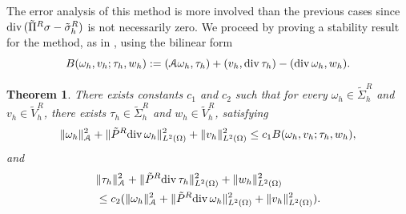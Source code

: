 \documentclass[12pt]{amsart}
\numberwithin{equation}{section}
\newtheorem{theorem}{Theorem}[section]
\theoremstyle{definition}
\theoremstyle{remark}
\renewcommand{\(}{\bigl(}
\renewcommand{\)}{\bigr)}
\newcommand{\tsigma}{\tilde{\sigma}}
\newcommand{\dive}{{\ensuremath\mathop{\mathrm{div}\,}}} %
\newcommand{\Aa}{\mathcal{A}}
\begin{document}
The error analysis of this method is more involved than the previous cases since $\dive( \tilde{\Pi}^R  \sigma-\tsigma^R_h)$  is not necessarily zero. We proceed
by proving a stability result for the method, as in \cite{arnold2006finite}, using
the bilinear form
\begin{equation*}
B(\omega_h, v_h; \tau_h, w_h):= (\Aa \omega_h, \tau_h)+(v_h, \dive \tau_h)-(\dive \omega_h, w_h). 
\end{equation*}

\begin{theorem} \label{thm:Babuska-Aziz-infsup}
There exists constants $c_1$ and $c_2$ such that 
for every $\omega_h \in \tilde{\Sigma}^R_h$ and $v_h \in \tilde{V}_h^R$, there exists $\tau_h \in \tilde{\Sigma}^R_h$ and $w_h \in \tilde{V}_h^R$, satisfying
\begin{alignat}{1}
\| \omega_h\|_{\Aa}^2+ \|\tilde{P}^R \dive \omega_h\|_{L^2(\Omega)}^2+\|v_h\|_{L^2(\Omega)}^2 \le c_1  B(\omega_h, v_h; \tau_h, w_h), \label{thminf1t}
\end{alignat}
and
\begin{alignat}{1}
 &  \|\tau_h\|_{\Aa}^2+ \|\tilde{P}^R \dive \tau_h\|_{L^2(\Omega)}^2 + \|w_h\|_{L^2(\Omega)}^2  \nonumber \\
 & \le  c_2 (\| \omega_h\|_{\Aa}^2+ \|\tilde{P}^R \dive \omega_h\|_{L^2(\Omega)}^2+\|v_h\|_{L^2(\Omega)}^2). \label{thminf2t}
\end{alignat}
\end{theorem}
\end{document}
